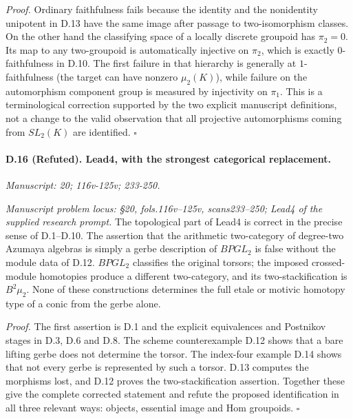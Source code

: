 \emph{Proof.} Ordinary faithfulness fails because the identity and the nonidentity unipotent in D.13 have the same image after passage to two-isomorphism classes. On the other hand the classifying space of a locally discrete groupoid has $\pi_2=0$. Its map to any two-groupoid is automatically injective on $\pi_2$, which is exactly $0$-faithfulness in D.10. The first failure in that hierarchy is generally at $1$-faithfulness (the target can have nonzero $\mu_2(K)$), while failure on the automorphism component group is measured by injectivity on $\pi_1$. This is a terminological correction supported by the two explicit manuscript definitions, not a change to the valid observation that all projective automorphisms coming from $SL_2(K)$ are identified. \hfill$\square$

\paragraph{D.16 (Refuted). Lead4, with the strongest categorical replacement.}
\textit{Manuscript: 20; 116v-125v; 233-250.}

\emph{Manuscript problem locus: \S20, fols.116v--125v, scans233--250; Lead4 of the supplied research prompt.}
The topological part of Lead4 is correct in the precise sense of D.1--D.10. The assertion that the arithmetic two-category of degree-two Azumaya algebras is simply a gerbe description of $BPGL_2$ is false without the module data of D.12. $BPGL_2$ classifies the original torsors; the imposed crossed-module homotopies produce a different two-category, and its two-stackification is $B^2\mu_2$. None of these constructions determines the full etale or motivic homotopy type of a conic from the gerbe alone.

\emph{Proof.} The first assertion is D.1 and the explicit equivalences and Postnikov stages in D.3, D.6 and D.8. The scheme counterexample D.12 shows that a bare lifting gerbe does not determine the torsor. The index-four example D.14 shows that not every gerbe is represented by such a torsor. D.13 computes the morphisms lost, and D.12 proves the two-stackification assertion. Together these give the complete corrected statement and refute the proposed identification in all three relevant ways: objects, essential image and Hom groupoids. \hfill$\square$
